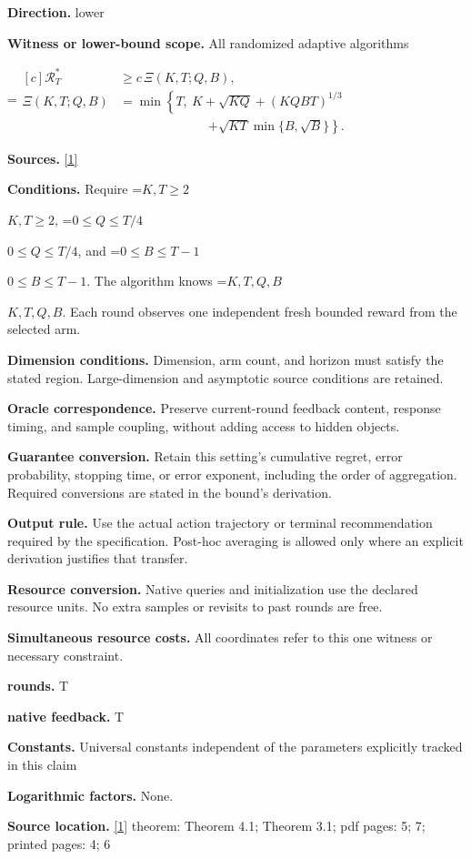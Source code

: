 \documentclass[10pt,a4paper]{article}
\newcommand{\AtlasMath}[1]{\par\begingroup\centering\setbox0=\hbox{$\displaystyle #1$}\ifdim\wd0>1.4\linewidth\typeout{ATLAS WIDE FORMULA: \the\wd0}\fi\ifdim\wd0>\linewidth\resizebox{\linewidth}{!}{\box0}\else\box0\fi\par\endgroup}
\newcommand{\AtlasInlineMath}[1]{\begingroup\setbox0=\hbox{$#1$}\ifdim\wd0>.4\linewidth\endgroup\AtlasMath{#1}\else\endgroup$#1$\fi}
\begin{document}
\textbf{Direction.} lower

\textbf{Witness or lower-bound scope.} All randomized adaptive algorithms

\AtlasMath{\begin{aligned}[c]\mathcal{R}_T^*&\ge c\,\Xi(K,T;Q,B),\\ \Xi(K,T;Q,B)&=\min\left\{T,\ K+\sqrt{KQ}+(KQBT)^{1/3}\right.\\ &\hspace{7em}\left.+\sqrt{KT}\min\{B,\sqrt B\}\right\}.\end{aligned}}
\textbf{Sources.} \href{https://arxiv.org/pdf/2610.26116}{[1]}

\textbf{Conditions.} Require \AtlasInlineMath{K,T\ge2}, \AtlasInlineMath{0\le Q\le T/4}, and \AtlasInlineMath{0\le B\le T-1}. The algorithm knows \AtlasInlineMath{K,T,Q,B}. Each round observes one independent fresh bounded reward from the selected arm.

\textbf{Dimension conditions.} Dimension, arm count, and horizon must satisfy the stated region. Large-dimension and asymptotic source conditions are retained.

\textbf{Oracle correspondence.} Preserve current-round feedback content, response timing, and sample coupling, without adding access to hidden objects.

\textbf{Guarantee conversion.} Retain this setting's cumulative regret, error probability, stopping time, or error exponent, including the order of aggregation. Required conversions are stated in the bound's derivation.

\textbf{Output rule.} Use the actual action trajectory or terminal recommendation required by the specification. Post-hoc averaging is allowed only where an explicit derivation justifies that transfer.

\textbf{Resource conversion.} Native queries and initialization use the declared resource units. No extra samples or revisits to past rounds are free.

\textbf{Simultaneous resource costs.} All coordinates refer to this one witness or necessary constraint.

\textbf{rounds.} T

\textbf{native feedback.} T

\textbf{Constants.} Universal constants independent of the parameters explicitly tracked in this claim

\textbf{Logarithmic factors.} None.

\textbf{Source location.} \href{https://arxiv.org/pdf/2610.26116}{[1]} theorem: Theorem 4.1; Theorem 3.1; pdf pages: 5; 7; printed pages: 4; 6
\end{document}
